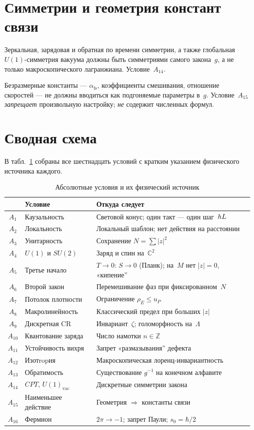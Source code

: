 \section{Симметрии и геометрия констант связи}

Зеркальная, зарядовая и обратная по времени симметрии, а также глобальная $U(1)$-симметрия
вакуума должны быть симметриями самого закона~$g$, а не только макроскопического лагранжиана.
Условие~$A_{14}$.

Безразмерные константы --- $\alpha_{\mathrm{fs}}$, коэффициенты смешивания, отношение скоростей ---
не должны вводиться как подгоняемые параметры в~$g$.
Условие~$A_{15}$ \emph{запрещает} произвольную настройку; \emph{не} содержит численных формул.

\section{Сводная схема}

В табл.~\ref{tab:full-map} собраны все шестнадцать условий с кратким указанием
физического источника каждого.

\begin{table}[ht]
\centering
\caption{Абсолютные условия и их физический источник}
\label{tab:full-map}
\small
\begin{tabular}{@{}clp{7.4cm}@{}}
\toprule
 & Условие & Откуда следует \\
\midrule
$A_1$ & Каузальность & Световой конус; один такт --- один шаг~$hL$ \\
$A_2$ & Локальность & Локальный шаблон; нет действия на расстоянии \\
$A_3$ & Унитарность & Сохранение $N=\sum|z|^2$ \\
$A_4$ & $U(1)$ и $SU(2)$ & Заряд и спин на~$\mathbb{C}^2$ \\
$A_5$ & Третье начало & $T\to 0$: $S\to 0$ (Планк); на~$M$ нет $|z|=0$, «кипение'' \\
$A_6$ & Второй закон & Перемешивание фаз при фиксированном~$N$ \\
$A_7$ & Потолок плотности & Ограничение $\rho_E\le u_P$ \\
$A_8$ & Макролинейность & Классический предел при больших $|z|$ \\
$A_9$ & Дискретная CR & Инвариант~$\zeta$; голоморфность на~$\Lambda$ \\
$A_{10}$ & Квантование заряда & Число намотки $n\in\mathbb{Z}$ \\
$A_{11}$ & Устойчивость вихря & Запрет «размазывания'' дефекта \\
$A_{12}$ & Изотropия & Макроскопическая лоренц-инвариантность \\
$A_{13}$ & Обратимость & Существование $g^{-1}$ на конечном алфавите \\
$A_{14}$ & $CPT$, $U(1)_{\mathrm{vac}}$ & Дискретные симметрии закона \\
$A_{15}$ & Наименьшее действие & Геометрия $\Rightarrow$ константы связи \\
$A_{16}$ & Фермион & $2\pi\to -1$; запрет Паули; $s_0=\hbar/2$ \\
\bottomrule
\end{tabular}
\end{table}

